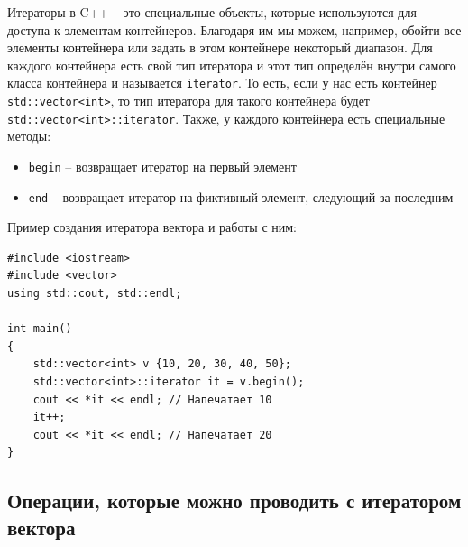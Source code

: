\documentclass{article}
\begin{document}
Итераторы в C++ -- это специальные объекты, которые используются для доступа к элементам контейнеров.
Благодаря им мы можем, например, обойти все элементы контейнера или задать в этом контейнере некоторый диапазон. Для каждого контейнера есть свой тип итератора и этот тип определён внутри самого класса контейнера и называется \texttt{iterator}. То есть, если у нас есть контейнер \texttt{std::vector<int>}, то тип итератора для такого контейнера будет \texttt{std::vector<int>::iterator}.
Также, у каждого контейнера есть специальные методы:
\begin{itemize}
\item \texttt{begin} -- возвращает итератор на первый элемент
\item \texttt{end} -- возвращает итератор на фиктивный элемент, следующий за последним
\end{itemize}
Пример создания итератора вектора и работы с ним:
\begin{lstlisting}
#include <iostream>
#include <vector>
using std::cout, std::endl;

int main()
{
    std::vector<int> v {10, 20, 30, 40, 50};
    std::vector<int>::iterator it = v.begin();
    cout << *it << endl; // Напечатает 10
    it++;
    cout << *it << endl; // Напечатает 20
}
\end{lstlisting}

\subsection*{Операции, которые можно проводить с итератором вектора}
\end{document}
